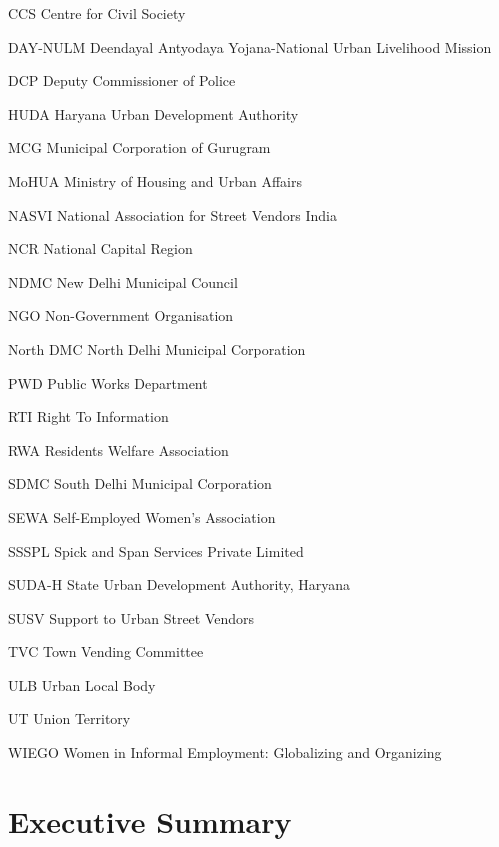 \documentclass[a4paper, 12pt, twoside]{article}
\begin{document}
\begin{abbrv}[nosep]

	\item[CCS]			Centre for Civil Society
        \item[DAY-NULM]			Deendayal Antyodaya Yojana-National Urban Livelihood Mission
        \item[DCP]			Deputy Commissioner of Police
	\item[HUDA]			Haryana Urban Development Authority
	\item[MCG]			Municipal Corporation of Gurugram
	\item[MoHUA]			Ministry of Housing and Urban Affairs
	\item[NASVI]			National Association for Street Vendors India
	\item[NCR]			National Capital Region
	\item[NDMC]			New Delhi Municipal Council
	\item[NGO]			Non-Government Organisation
	\item[North DMC]			North Delhi Municipal Corporation
	\item[PWD]			Public Works Department
	\item[RTI]			Right To Information
	\item[RWA]			Residents Welfare Association
	\item[SDMC]			South Delhi Municipal Corporation
	\item[SEWA]			Self-Employed Women's Association
	\item[SSSPL]			Spick and Span Services Private Limited
	\item[SUDA-H]			State Urban Development Authority, Haryana
	\item[SUSV]			Support to Urban Street Vendors
	\item[TVC]			Town Vending Committee
	\item[ULB]			Urban Local Body
	\item[UT]			Union Territory
	\item[WIEGO]			Women in Informal Employment: Globalizing and Organizing


\end{abbrv}

\newpage
\section*{Executive Summary}
\end{document}
